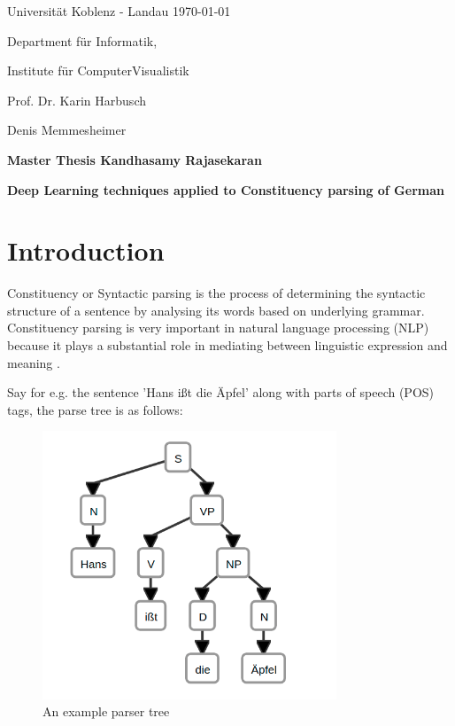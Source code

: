 \documentclass[a4paper, 11pt]{article}
\newcommand{\myName}{Kandhasamy Rajasekaran}
\newcommand{\Title}{Deep Learning techniques applied to Constituency parsing of German}
\newcommand{\subject}{Institute f\"{u}r ComputerVisualistik}
\newcommand{\supervisor}{Prof. Dr. Karin Harbusch} %
\newcommand{\secondSupervisor}{Denis Memmesheimer} %
\newcommand{\type}{Master Thesis}
\begin{document}
Universit\"{a}t Koblenz - Landau \hfill \today

Department f\"{u}r Informatik,

\subject{}

\supervisor{}

\secondSupervisor{}

\begin{center}
	\large{\bf \type{}  \myName{}}

	\vspace*{0.5cm}

	\large{\bf \Title}
\end{center}

\setlength{\parskip}{1.5ex plus0.5ex minus 0.5ex}


\section{Introduction}
\frenchspacing

Constituency or Syntactic parsing is the process of determining the syntactic structure of a sentence by analysing its words based on underlying grammar. Constituency parsing is very important in natural language processing (NLP) because it plays a substantial role in mediating between linguistic expression and meaning \parencite*{Socher}. 

Say for e.g. the sentence 'Hans ißt die Äpfel' along with parts of speech (POS) tags, the parse tree is as follows:

\begin{figure}[htpb]
    \centering
    \includegraphics[width=\textwidth,height=8cm,keepaspectratio=true]
    {hans-eats-apples.png}
    \caption{
        An example parser tree
    }
    \label{fig:An example parser tree network}
\end{figure}
\end{document}
